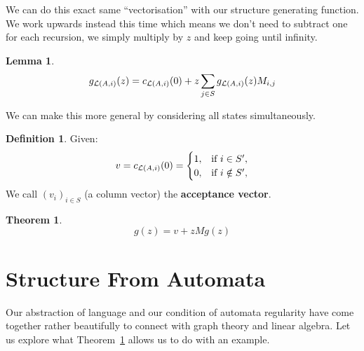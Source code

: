 \documentclass[a4paper]{article}
\newtheorem{theorem}{Theorem}[section]
\newtheorem{lemma}{Lemma}[section]
\theoremstyle{definition}
\newtheorem{definition}{Definition}[section]
\theoremstyle{definition}
\theoremstyle{definition}
\begin{document}
We can do this exact same ``vectorisation'' with our structure generating function. We work upwards instead this time which means we don't need to subtract one for each recursion, we simply multiply by \(z\) and keep going until infinity.

\begin{lemma}
    \[
    g_{\mathcal{L}(A, i)}(z) = c_{\mathcal{L}(A, i)}(0) + z \sum_{j \in S} g_{\mathcal{L}(A, i)}(z) M_{i,j}
    \]
\end{lemma}

We can make this more general by considering all states simultaneously.

\begin{definition} Given:
    \[
    v = c_{\mathcal{L}(A, i)}(0) = 
    \begin{cases}
        1, & \text{if } i \in S^\prime, \\
        0, & \text{if } i \notin S^\prime,
    \end{cases}
    \]
    We call $(v_i)_{i \in S}$ (a column vector) the \textbf{acceptance vector}.
\end{definition}

\begin{theorem}
    \label{thm:vectorized}
    \[
    g(z) = v + z M g(z)
    \]
\end{theorem}

\section{Structure From Automata}

Our abstraction of language and our condition of automata regularity have come together rather beautifully to connect with graph theory and linear algebra. Let us explore what Theorem~\ref{thm:vectorized} allows us to do with an example.
\end{document}
